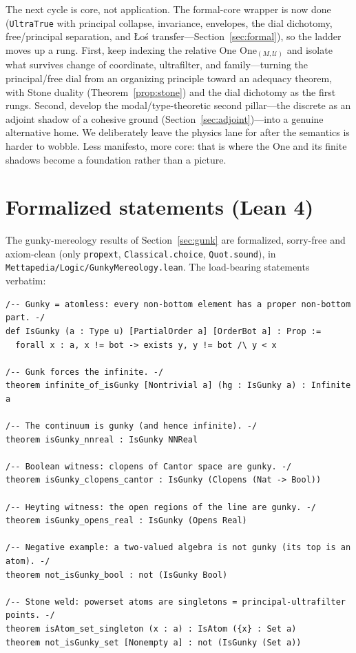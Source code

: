\documentclass[]{article}
\theoremstyle{definition}
\theoremstyle{remark}
\newcommand{\code}[1]{\texttt{#1}}
\newcommand{\lpath}[1]{{\ttfamily\nolinkurl{#1}}}
\newcommand{\Uf}{\mathcal{U}}
\begin{document}
The next cycle is core, not application. The formal-core wrapper is now done
(\code{UltraTrue} with principal collapse, invariance, envelopes, the dial dichotomy,
free/principal separation, and {\L}o\'s transfer---Section~\ref{sec:formal}), so the
ladder moves up a rung. First,
keep indexing the relative One $\mathrm{One}_{(M,\Uf)}$ and isolate what survives
change of coordinate, ultrafilter, and family---turning the principal/free dial from an
organizing principle toward an adequacy theorem, with Stone duality
(Theorem~\ref{prop:stone}) and the dial dichotomy as the first rungs. Second, develop the modal/type-theoretic
second pillar---the discrete as an adjoint shadow of a cohesive ground
(Section~\ref{sec:adjoint})---into a genuine alternative home. We deliberately leave
the physics lane for after the semantics is harder to wobble. Less manifesto, more
core: that is where the One and its finite shadows become a foundation rather than a
picture.

\appendix

\section{Formalized statements (Lean 4)}
\label{app:lean}

The gunky-mereology results of Section~\ref{sec:gunk} are formalized, sorry-free and
axiom-clean (only \code{propext}, \code{Classical.choice}, \code{Quot.sound}), in
\lpath{Mettapedia/Logic/GunkyMereology.lean}. The load-bearing statements verbatim:

\begin{lstlisting}
/-- Gunky = atomless: every non-bottom element has a proper non-bottom part. -/
def IsGunky (a : Type u) [PartialOrder a] [OrderBot a] : Prop :=
  forall x : a, x != bot -> exists y, y != bot /\ y < x

/-- Gunk forces the infinite. -/
theorem infinite_of_isGunky [Nontrivial a] (hg : IsGunky a) : Infinite a

/-- The continuum is gunky (and hence infinite). -/
theorem isGunky_nnreal : IsGunky NNReal

/-- Boolean witness: clopens of Cantor space are gunky. -/
theorem isGunky_clopens_cantor : IsGunky (Clopens (Nat -> Bool))

/-- Heyting witness: the open regions of the line are gunky. -/
theorem isGunky_opens_real : IsGunky (Opens Real)

/-- Negative example: a two-valued algebra is not gunky (its top is an atom). -/
theorem not_isGunky_bool : not (IsGunky Bool)

/-- Stone weld: powerset atoms are singletons = principal-ultrafilter points. -/
theorem isAtom_set_singleton (x : a) : IsAtom ({x} : Set a)
theorem not_isGunky_set [Nonempty a] : not (IsGunky (Set a))
\end{lstlisting}
\end{document}
